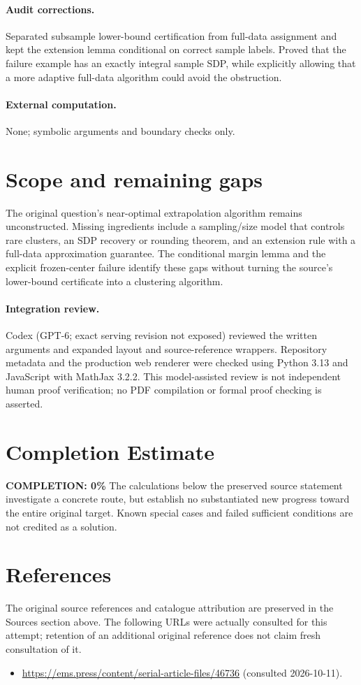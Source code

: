 \documentclass[11pt]{article}
\begin{document}
\paragraph{Audit corrections.} Separated subsample lower-bound certification from full-data assignment and kept the extension lemma conditional on correct sample labels. Proved that the failure example has an exactly integral sample SDP, while explicitly allowing that a more adaptive full-data algorithm could avoid the obstruction.
\paragraph{External computation.} None; symbolic arguments and boundary checks only.
\section{Scope and remaining gaps}
The original question's near-optimal extrapolation algorithm remains unconstructed. Missing ingredients include a sampling/size model that controls rare clusters, an SDP recovery or rounding theorem, and an extension rule with a full-data approximation guarantee. The conditional margin lemma and the explicit frozen-center failure identify these gaps without turning the source's lower-bound certificate into a clustering algorithm.
\paragraph{Integration review.} Codex (GPT-6; exact serving revision not exposed) reviewed the written arguments and expanded layout and source-reference wrappers. Repository metadata and the production web renderer were checked using Python 3.13 and JavaScript with MathJax 3.2.2. This model-assisted review is not independent human proof verification; no PDF compilation or formal proof checking is asserted.

\section{Completion Estimate}
\noindent\textbf{COMPLETION: 0\%}
The calculations below the preserved source statement investigate a concrete route,
but establish no substantiated new progress toward the entire original target.
Known special cases and failed sufficient conditions are not credited as a solution.
\section{References}
The original source references and catalogue attribution are preserved in the
Sources section above. The following URLs were actually consulted for this attempt;
retention of an additional original reference does not claim fresh consultation of it.
\begin{itemize}
\item \url{https://ems.press/content/serial-article-files/46736} (consulted 2026-10-11). 
\end{itemize}
\end{document}
